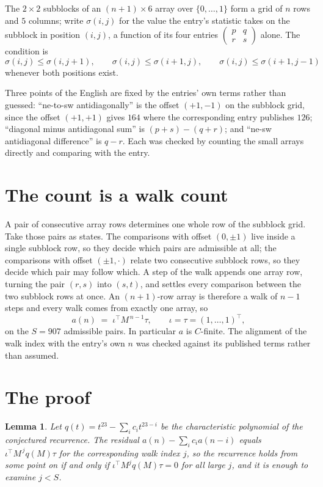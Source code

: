 \documentclass[11pt,a4paper]{article}
\theoremstyle{plain}
\newtheorem{lemma}[theorem]{Lemma}
\theoremstyle{definition}
\begin{document}
The $2\times2$ subblocks of an $(n+1)\times6$ array over $\{0,\dots,1\}$ form a grid
of $n$ rows and $5$ columns; write $\sigma(i,j)$ for the value the entry's statistic takes on
the subblock in position $(i,j)$, a function of its four entries
$\begin{pmatrix}p&q\\r&s\end{pmatrix}$ alone. The condition is
\[
\sigma(i,j)\le\sigma(i,j+1),\qquad \sigma(i,j)\le\sigma(i+1,j),\qquad \sigma(i,j)\le\sigma(i+1,j-1)
\]
whenever both positions exist.

Three points of the English are fixed by the entries' own terms rather than guessed:
``ne-to-sw antidiagonally'' is the offset $(+1,-1)$ on the subblock grid, since the offset
$(+1,+1)$ gives $164$ where the corresponding entry publishes $126$; ``diagonal minus
antidiagonal sum'' is $(p+s)-(q+r)$; and ``ne-sw antidiagonal difference'' is $q-r$. Each was
checked by counting the small arrays directly and comparing with the entry.

\section{The count is a walk count}

A pair of consecutive array rows determines one whole row of the subblock grid. Take those
pairs as states. The comparisons with offset $(0,\pm1)$ live inside a single subblock row, so
they decide which pairs are admissible at all; the comparisons with offset $(\pm1,\cdot)$
relate two consecutive subblock rows, so they decide which pair may follow which. A step of the
walk appends one array row, turning the pair $(r,s)$ into $(s,t)$, and settles every comparison
between the two subblock rows at once. An $(n+1)$-row array is therefore a walk of $n-1$ steps
and every walk comes from exactly one array, so
\[
a(n)\;=\;\iota^{\!\top}M^{\,n-1}\tau,\qquad \iota=\tau=(1,\dots,1)^{\!\top},
\]
on the $S=907$ admissible pairs. In particular $a$ is $C$-finite. The alignment of the walk
index with the entry's own $n$ was checked against its published terms rather than assumed.

\section{The proof}

\begin{lemma}\label{lem:crit}
Let $q(t)=t^{23}-\sum_i c_it^{23-i}$ be the characteristic polynomial of the
conjectured recurrence. The residual $a(n)-\sum_ic_ia(n-i)$ equals
$\iota^{\!\top}M^{\,j}q(M)\tau$ for the corresponding walk index $j$, so the recurrence
holds from some point on if and only if $\iota^{\!\top}M^{j}q(M)\tau=0$ for all large $j$,
and it is enough to examine $j<S$.
\end{lemma}
\end{document}
